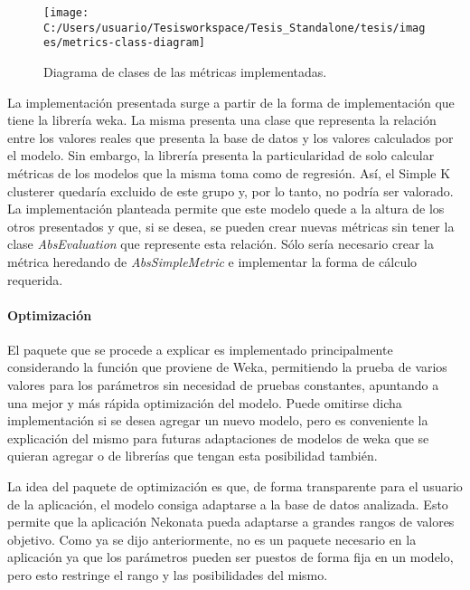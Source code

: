 \begin{figure}
\begin{centering}
\texttt{[image: C:/Users/usuario/Tesisworkspace/Tesis\_Standalone/tesis/images/metrics-class-diagram]}
\par\end{centering}

\caption{Diagrama de clases de las métricas implementadas.\label{fig:metrics-class-diagram}}
\end{figure}


La implementación presentada surge a partir de la forma de implementación
que tiene la librería weka. La misma presenta una clase que representa
la relación entre los valores reales que presenta la base de datos
y los valores calculados por el modelo. Sin embargo, la librería presenta
la particularidad de solo calcular métricas de los modelos que la
misma toma como de regresión. Así, el Simple K clusterer quedaría
excluido de este grupo y, por lo tanto, no podría ser valorado. La
implementación planteada permite que este modelo quede a la altura
de los otros presentados y que, si se desea, se pueden crear nuevas
métricas sin tener la clase \emph{AbsEvaluation} que represente esta
relación. Sólo sería necesario crear la métrica heredando de \emph{AbsSimpleMetric}
e implementar la forma de cálculo requerida.


\paragraph*{Optimización}

El paquete que se procede a explicar es implementado principalmente
considerando la función que proviene de Weka, permitiendo la prueba
de varios valores para los parámetros sin necesidad de pruebas constantes,
apuntando a una mejor y más rápida optimización del modelo. Puede
omitirse dicha implementación si se desea agregar un nuevo modelo,
pero es conveniente la explicación del mismo para futuras adaptaciones
de modelos de weka que se quieran agregar o de librerías que tengan
esta posibilidad también. 

La idea del paquete de optimización es que, de forma transparente
para el usuario de la aplicación, el modelo consiga adaptarse a la
base de datos analizada. Esto permite que la aplicación Nekonata pueda
adaptarse a grandes rangos de valores objetivo. Como ya se dijo anteriormente,
no es un paquete necesario en la aplicación ya que los parámetros
pueden ser puestos de forma fija en un modelo, pero esto restringe
el rango y las posibilidades del mismo. 

